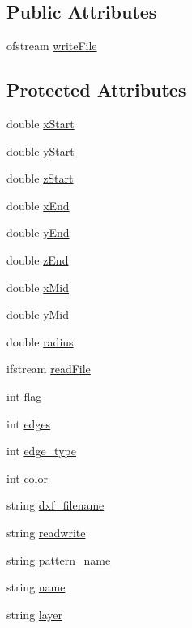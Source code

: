 \subsection*{Public Attributes}
\begin{DoxyCompactItemize}
\item 
ofstream \hyperlink{classbase_a1a4cdb81a9c9f77818a0fdd34165a1ab}{write\-File}
\end{DoxyCompactItemize}
\subsection*{Protected Attributes}
\begin{DoxyCompactItemize}
\item 
double \hyperlink{classbase_a7703056e2be3f7e97f974e77146c3a02}{x\-Start}
\item 
double \hyperlink{classbase_a11d50718a751a277f133430692b13bbf}{y\-Start}
\item 
double \hyperlink{classbase_aa53533269b638644cb48a1cafc969852}{z\-Start}
\item 
double \hyperlink{classbase_aa4702751e837e49dcb88eaf2944f3c1f}{x\-End}
\item 
double \hyperlink{classbase_aa5a4fed2eaf64367a8ef693d8d054081}{y\-End}
\item 
double \hyperlink{classbase_ad599903bf17e619b3fe11c592f981682}{z\-End}
\item 
double \hyperlink{classbase_a83f02880ca88c37fcb28acced4d6b9a7}{x\-Mid}
\item 
double \hyperlink{classbase_acb79a7b7e25b442e350a151626f8aa46}{y\-Mid}
\item 
double \hyperlink{classbase_a36bed779447a9b6e7a902dc1d065ffb2}{radius}
\item 
ifstream \hyperlink{classbase_a707f4830c851eb50e9e2299fae731075}{read\-File}
\item 
int \hyperlink{classbase_ac16efe03b1a537989afd2a1eebdde0e9}{flag}
\item 
int \hyperlink{classbase_af5da8689af8a9b1bf5376873bbece1ae}{edges}
\item 
int \hyperlink{classbase_a65b11e6006cd45d381b31d6fbaa82c67}{edge\-\_\-type}
\item 
int \hyperlink{classbase_af8027c0e104b55838579c8cae311b558}{color}
\item 
string \hyperlink{classbase_aa3e204024e466de567044e1e992d39db}{dxf\-\_\-filename}
\item 
string \hyperlink{classbase_a8d165e9a0576b127d61404745e4deb1a}{readwrite}
\item 
string \hyperlink{classbase_a7ea31106027652ddba7c37809cade6ac}{pattern\-\_\-name}
\item 
string \hyperlink{classbase_adc118bdac066f100bb2ce0fa6d1cd657}{name}
\item 
string \hyperlink{classbase_ace32e46b9aa7521f7523e57e148dd248}{layer}
\end{DoxyCompactItemize}


